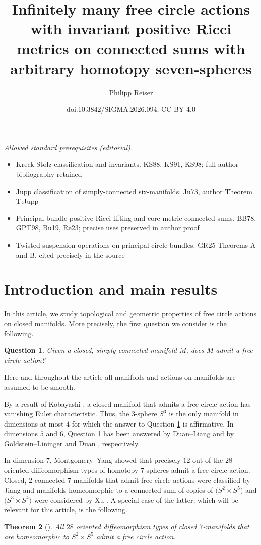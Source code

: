 \documentclass[10pt,a4paper]{amsart}
\title{Infinitely many free circle actions with invariant positive Ricci metrics on connected sums with arbitrary homotopy seven-spheres}
\author{Philipp Reiser}
\date{doi:10.3842/SIGMA.2026.094; CC BY 4.0}
\numberwithin{equation}{section}
\newtheorem{Theorem}{Theorem}[section]
\newtheorem{Question}[Theorem]{Question}
\theoremstyle{definition}
\numberwithin{table}{section}
\begin{document}
\maketitle
\noindent\textit{Allowed standard prerequisites (editorial).}\begin{itemize}
\item Kreck-Stolz classification and invariants. KS88, KS91, KS98; full author bibliography retained
\item Jupp classification of simply-connected six-manifolds. Ju73, author Theorem T:Jupp
\item Principal-bundle positive Ricci lifting and core metric connected sums. BB78, GPT98, Bu19, Re23; precise uses preserved in author proof
\item Twisted suspension operations on principal circle bundles. GR25 Theorems A and B, cited precisely in the source
\end{itemize}\medskip
\section{Introduction and main results}

In this article, we study topological and geometric properties of free circle actions on closed manifolds. More precisely, the first question we consider is the following.
\begin{Question}\label{Q:free_circ_ex}
	Given a closed, simply-connected manifold $M$, does $M$ admit a free circle action?
\end{Question}
Here and throughout the article all manifolds and actions on manifolds are assumed to be smooth.

By a result of Kobayashi \cite{Ko58}, a closed manifold that admits a free circle action has vanishing Euler characteristic. Thus, the $3$-sphere $S^3$ is the only manifold in dimensions at most $4$ for which the answer to Question \ref{Q:free_circ_ex} is affirmative. In dimensions $5$ and $6$, Question \ref{Q:free_circ_ex} has been answered by Duan--Liang \cite{DL05} and by Goldstein--Lininger \cite{GL71} and Duan \cite{Du26}, respectively.

In dimension $7$, Montgomery--Yang \cite{MY68} showed that precisely $12$ out of the $28$ oriented diffeomorphism types of homotopy $7$-spheres admit a free circle action. Closed, $2$-connected $7$-manifolds that admit free circle actions were classified by Jiang \cite{Ji14} and manifolds homeomorphic to a connected sum of copies of $\bigl(S^2\times S^5\bigr)$ and $\bigl(S^3\times S^4\bigr)$ were considered by Xu \cite{Xu25}. A special case of the latter, which will be relevant for this article, is the following.
\begin{Theorem}[{\cite[Proposition 1]{Xu25}}]\label{T:S2xS5_hom}
	All $28$ oriented diffeomorphism types of closed $7$-manifolds that are homeomorphic to $S^2\times S^5$ admit a free circle action.
\end{Theorem}
\end{document}
